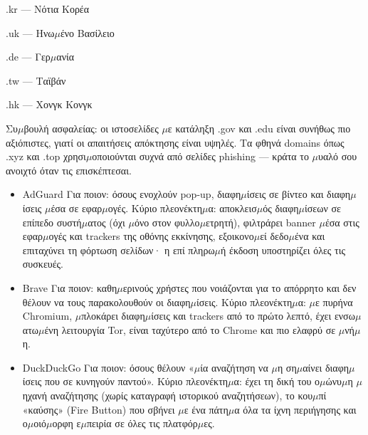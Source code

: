 .kr — Νότια Κορέα

.uk — Ηνω$\mu$ένο Βασίλειο

.de — Γερ$\mu$ανία

.tw — Ταϊβάν

.hk — Χονγκ Κονγκ

Συ$\mu$βουλή ασφαλείας: οι ιστοσελίδες $\mu$ε κατάληξη .gov και .edu είναι συνήθως πιο αξιόπιστες, γιατί οι απαιτήσεις απόκτησης είναι υψηλές. Τα φθηνά domains όπως .xyz και .top χρησι$\mu$οποιούνται συχνά από σελίδες phishing — κράτα το $\mu$υαλό σου ανοιχτό όταν τις επισκέπτεσαι.


\begin{itemize}
  \item AdGuard Για ποιον: όσους ενοχλούν pop-up, διαφη$\mu$ίσεις σε βίντεο και διαφη$\mu$ίσεις $\mu$έσα σε εφαρ$\mu$ογές. Κύριο πλεονέκτη$\mu$α: αποκλεισ$\mu$ός διαφη$\mu$ίσεων σε επίπεδο συστή$\mu$ατος (όχι $\mu$όνο στον φυλλο$\mu$ετρητή), φιλτράρει banner $\mu$έσα στις εφαρ$\mu$ογές και trackers της οθόνης εκκίνησης, εξοικονο$\mu$εί δεδο$\mu$ένα και επιταχύνει τη φόρτωση σελίδων· η επί πληρω$\mu$ή έκδοση υποστηρίζει όλες τις συσκευές.
\end{itemize}


\begin{itemize}
  \item Brave Για ποιον: καθη$\mu$ερινούς χρήστες που νοιάζονται για το απόρρητο και δεν θέλουν να τους παρακολουθούν οι διαφη$\mu$ίσεις. Κύριο πλεονέκτη$\mu$α: $\mu$ε πυρήνα Chromium, $\mu$πλοκάρει διαφη$\mu$ίσεις και trackers από το πρώτο λεπτό, έχει ενσω$\mu$ατω$\mu$ένη λειτουργία Tor, είναι ταχύτερο από το Chrome και πιο ελαφρύ σε $\mu$νή$\mu$η.
  \item DuckDuckGo Για ποιον: όσους θέλουν «$\mu$ία αναζήτηση να $\mu$η ση$\mu$αίνει διαφη$\mu$ίσεις που σε κυνηγούν παντού». Κύριο πλεονέκτη$\mu$α: έχει τη δική του ο$\mu$ώνυ$\mu$η $\mu$ηχανή αναζήτησης (χωρίς καταγραφή ιστορικού αναζητήσεων), το κου$\mu$πί «καύσης» (Fire Button) που σβήνει $\mu$ε ένα πάτη$\mu$α όλα τα ίχνη περιήγησης και ο$\mu$οιό$\mu$ορφη ε$\mu$πειρία σε όλες τις πλατφόρ$\mu$ες.
\end{itemize}



